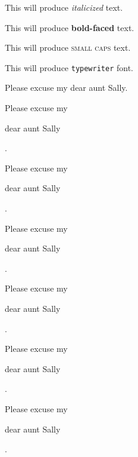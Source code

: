 \documentclass[12pt]{article}
\begin{document}
This will produce \textit{italicized} text.

This will produce \textbf{bold-faced} text.

This will produce \textsc{small caps} text.

This will produce \texttt{typewriter} font.

Please excuse my dear aunt Sally.

Please excuse my \begin{large}dear aunt Sally\end{large}. 

Please excuse my \begin{Large}dear aunt Sally\end{Large}. 

Please excuse my \begin{huge}dear aunt Sally\end{huge}. 

Please excuse my \begin{Huge}dear aunt Sally\end{Huge}. 

Please excuse my \begin{small}dear aunt Sally\end{small}. 

Please excuse my \begin{tiny}dear aunt Sally\end{tiny}. 
\end{document}
